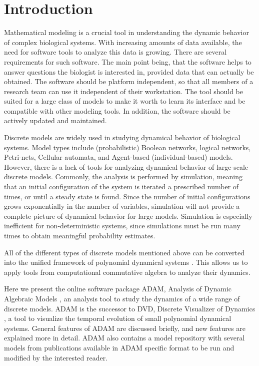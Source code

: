 \documentclass[11pt]{amsart}
\begin{document}
\section{Introduction} 

Mathematical modeling is a crucial tool in understanding the dynamic behavior of complex
biological systems. With increasing amounts of data available, the need for software tools to analyze this data is growing. There are several requirements for such software. The main point being, that the software helps to answer questions the biologist is interested in, provided data that can actually be obtained. The software should be platform independent, so that all members of a research team can use it independent of their workstation. The tool should be suited for a large class of models to make it worth to learn its interface and be compatible with other modeling tools. In addition, the software should be actively updated and maintained. 

Discrete models are widely used in studying dynamical behavior of biological systems. Model types include
(probabilistic) Boolean networks, logical networks, Petri-nets, Cellular
automata, and Agent-based (individual-based) models. 
However, there is a lack of tools
for analyzing dynamical behavior of large-scale discrete models. Commonly, the analysis is performed by simulation, meaning that an
initial configuration of the system is iterated a prescribed number of times, or until a
steady state is found. Since the number of initial configurations grows exponentially in the number of variables, simulation
will not provide a complete picture of dynamical behavior for large models.
Simulation is especially inefficient for non-deterministic
systems, since simulations must be run many times to obtain meaningful
probability estimates.

All of the different types of discrete models mentioned above can be
converted into the unified framework of polynomial dynamical systems
\cite{Alan:Bioinf2010, Hinkelmann:2010}. This allows us to apply tools from
computational commutative algebra to analyze their dynamics. 

Here we present the online software package ADAM, Analysis of Dynamic Algebraic Models \cite{ADAM}, an analysis tool to study the dynamics of a wide range of discrete models. ADAM is the successor to DVD, Discrete Visualizer of Dynamics \cite{DVD}, a tool to visualize the temporal evolution of small polynomial dynamical systems. 
General features of ADAM are discussed briefly, and new features are explained more in detail. ADAM also contains a model repository with several models from publications available in ADAM specific format to be run and modified by the interested reader.
\end{document}
